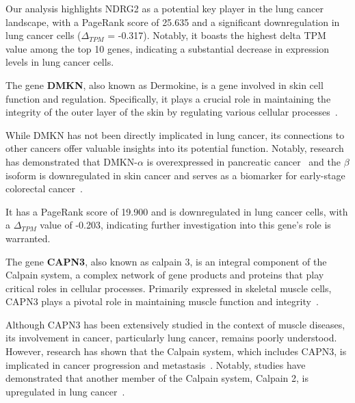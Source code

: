 Our analysis highlights NDRG2 as a potential key player in the lung cancer landscape,
with a PageRank score of 25.635 and a significant downregulation in lung cancer cells ($\Delta_{TPM}$ = -0.317).
Notably, it boasts the highest delta TPM value among the top 10 genes,
indicating a substantial decrease in expression levels in lung cancer cells.
\newline



The gene \textbf{DMKN}, also known as Dermokine, is a gene involved in skin cell function and regulation.
Specifically, it plays a crucial role in maintaining the integrity of the outer layer of the skin
by regulating various cellular processes~\cite{Naso2007Deromokine}.

While DMKN has not been directly implicated in lung cancer, its connections to other cancers offer valuable insights into its potential function.
Notably, research has demonstrated that DMKN-$\alpha$ is overexpressed in pancreatic cancer~\cite{Zhang2022DMKN}
and the $\beta$ isoform is downregulated in skin cancer and serves as a biomarker for early-stage colorectal cancer~\cite{Hasegawa2012Dermokine}.

It has a PageRank score of 19.900 and is downregulated in lung cancer cells,
with a $\Delta_{TPM}$ value of -0.203, indicating further investigation into this gene's role is warranted.
\newline

The gene \textbf{CAPN3}, also known as calpain 3, is an integral component of the Calpain system,
a complex network of gene products and proteins that play critical roles in cellular processes.
Primarily expressed in skeletal muscle cells, CAPN3 plays a pivotal role in maintaining muscle function and integrity~\cite{Spinozzi2021Calpain}.

Although CAPN3 has been extensively studied in the context of muscle diseases,
its involvement in cancer, particularly lung cancer, remains poorly understood.
However, research has shown that the Calpain system, which includes CAPN3, is implicated in cancer progression and metastasis~\cite{Storr2011Calpain}.
Notably, studies have demonstrated that another member of the Calpain system, Calpain 2, is upregulated in lung cancer~\cite{Xu2019Calpain}.

